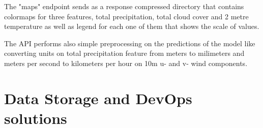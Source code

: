 The "maps" endpoint sends as a response compressed directory that contains colormaps for three features, total precipitation, total cloud cover and 2 metre temperature as well as legend for each one of them that shows the scale of values. 



The API performs also simple preprocessing on the predictions of the model like converting units on total precipitation feature from meters to milimeters and meters per second to kilometers per hour on 10m u- and v- wind components.

\section{Data Storage and DevOps solutions}

